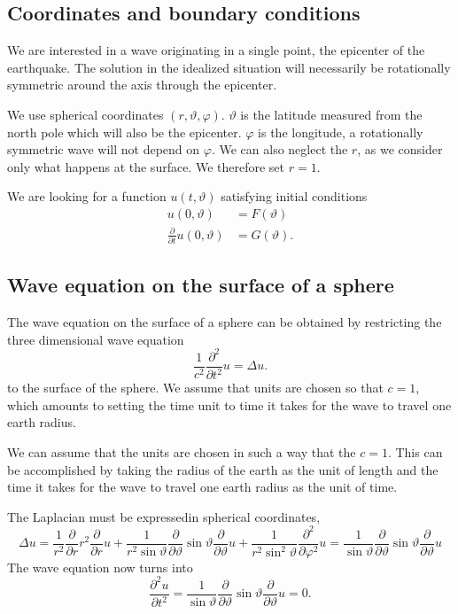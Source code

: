 \subsection{Coordinates and boundary conditions}
We are interested in a wave originating in a single point, the
epicenter of the earthquake.
The solution in the idealized situation will necessarily be rotationally
symmetric around the axis through the epicenter.

We use spherical coordinates $(r,\vartheta,\varphi)$.
$\vartheta$ is the latitude measured from the north pole which will
also be the epicenter.
$\varphi$ is the longitude, a rotationally symmetric wave will not
depend on $\varphi$.
We can also neglect the $r$, as we consider only what happens at the
surface.
We therefore set $r=1$.

We are looking for a function
$u(t,\vartheta)$ satisfying initial conditions
\begin{align*}
u(0,\vartheta)&=F(\vartheta)\\
\frac{\partial}{\partial t}u(0,\vartheta)&=G(\vartheta).
\end{align*}

\subsection{Wave equation on the surface of a sphere}
The wave equation on the surface of a sphere can be obtained
by restricting the three dimensional wave equation
\[
\frac1{c^2} \frac{\partial^2}{\partial t^2}u =\Delta u.
\]
to the surface of the sphere.
We assume that units are chosen so that $c=1$, which amounts
to setting the time unit to time it takes for the wave to travel
one earth radius.

We can assume that the units are chosen in such a way that 
the $c=1$.
This can be accomplished by taking the radius of the earth as the
unit of length and the time it takes for the wave to travel one
earth radius as the unit of time.

The Laplacian must be expressedin spherical coordinates,
\[
\Delta u
=
\frac1{r^2} \frac{\partial}{\partial r}r^2\frac{\partial}{\partial r}u
+
\frac1{r^2\sin\vartheta}
\frac{\partial}{\partial\vartheta}
\sin\vartheta
\frac{\partial}{\partial\vartheta}
u
+
\frac1{r^2\sin^2\vartheta}\frac{\partial^2}{\partial\varphi^2}u
=
\frac1{\sin\vartheta}
\frac{\partial}{\partial\vartheta}
\sin\vartheta
\frac{\partial}{\partial\vartheta}
u
\]
The wave equation now turns into
\begin{equation}
\frac{\partial^2u}{\partial t^2}=
\frac1{\sin\vartheta}
\frac{\partial}{\partial\vartheta}
\sin\vartheta
\frac{\partial}{\partial\vartheta}
u=0.
\label{tsunami-gleichung}
\end{equation}


